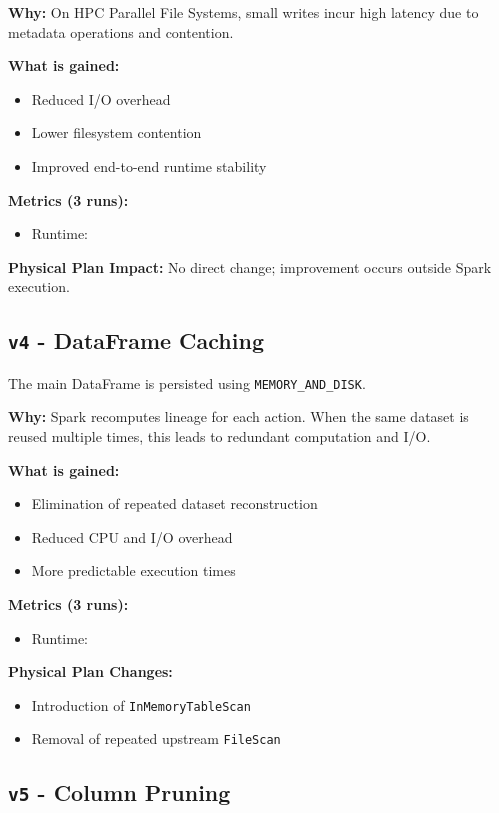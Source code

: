 \documentclass[conference,a4paper]{IEEEtran}
\begin{document}
\textbf{Why:}
On HPC Parallel File Systems, small writes incur high latency due to metadata
operations and contention.

\textbf{What is gained:}
\begin{itemize}
    \item Reduced I/O overhead
    \item Lower filesystem contention
    \item Improved end-to-end runtime stability
\end{itemize}

\textbf{Metrics (3 runs):}
\begin{itemize}
    \item Runtime: \texttt{}
\end{itemize}

\textbf{Physical Plan Impact:}
No direct change; improvement occurs outside Spark execution.

\subsection{\texttt{v4} - DataFrame Caching}
\label{sec:v4}

The main DataFrame is persisted using
\texttt{MEMORY\_AND\_DISK}.

\textbf{Why:}
Spark recomputes lineage for each action. When the same dataset is reused
multiple times, this leads to redundant computation and I/O.

\textbf{What is gained:}
\begin{itemize}
    \item Elimination of repeated dataset reconstruction
    \item Reduced CPU and I/O overhead
    \item More predictable execution times
\end{itemize}

\textbf{Metrics (3 runs):}
\begin{itemize}
    \item Runtime: \texttt{}
\end{itemize}

\textbf{Physical Plan Changes:}
\begin{itemize}
    \item Introduction of \texttt{InMemoryTableScan}
    \item Removal of repeated upstream \texttt{FileScan}
\end{itemize}

\subsection{\texttt{v5} - Column Pruning}
\label{sec:v5}
\end{document}
